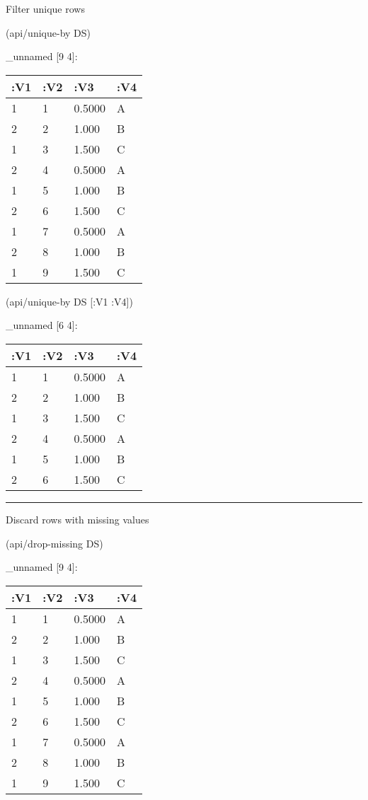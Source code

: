 \documentclass[]{article}
\newenvironment{Shaded}{\begin{snugshade}}{\end{snugshade}}
\newcommand{\AttributeTok}[1]{\textcolor[rgb]{0.77,0.63,0.00}{#1}}
\newcommand{\NormalTok}[1]{#1}
\begin{document}
Filter unique rows

\begin{Shaded}
\begin{Highlighting}[]
\NormalTok{(api/unique-by DS)}
\end{Highlighting}
\end{Shaded}

\_unnamed {[}9 4{]}:

\begin{longtable}[]{@{}llll@{}}
\toprule
:V1 & :V2 & :V3 & :V4\tabularnewline
\midrule
\endhead
1 & 1 & 0.5000 & A\tabularnewline
2 & 2 & 1.000 & B\tabularnewline
1 & 3 & 1.500 & C\tabularnewline
2 & 4 & 0.5000 & A\tabularnewline
1 & 5 & 1.000 & B\tabularnewline
2 & 6 & 1.500 & C\tabularnewline
1 & 7 & 0.5000 & A\tabularnewline
2 & 8 & 1.000 & B\tabularnewline
1 & 9 & 1.500 & C\tabularnewline
\bottomrule
\end{longtable}

\begin{Shaded}
\begin{Highlighting}[]
\NormalTok{(api/unique-by DS [}\AttributeTok{:V1} \AttributeTok{:V4}\NormalTok{])}
\end{Highlighting}
\end{Shaded}

\_unnamed {[}6 4{]}:

\begin{longtable}[]{@{}llll@{}}
\toprule
:V1 & :V2 & :V3 & :V4\tabularnewline
\midrule
\endhead
1 & 1 & 0.5000 & A\tabularnewline
2 & 2 & 1.000 & B\tabularnewline
1 & 3 & 1.500 & C\tabularnewline
2 & 4 & 0.5000 & A\tabularnewline
1 & 5 & 1.000 & B\tabularnewline
2 & 6 & 1.500 & C\tabularnewline
\bottomrule
\end{longtable}

\begin{center}\rule{0.5\linewidth}{0.5pt}\end{center}

Discard rows with missing values

\begin{Shaded}
\begin{Highlighting}[]
\NormalTok{(api/drop-missing DS)}
\end{Highlighting}
\end{Shaded}

\_unnamed {[}9 4{]}:

\begin{longtable}[]{@{}llll@{}}
\toprule
:V1 & :V2 & :V3 & :V4\tabularnewline
\midrule
\endhead
1 & 1 & 0.5000 & A\tabularnewline
2 & 2 & 1.000 & B\tabularnewline
1 & 3 & 1.500 & C\tabularnewline
2 & 4 & 0.5000 & A\tabularnewline
1 & 5 & 1.000 & B\tabularnewline
2 & 6 & 1.500 & C\tabularnewline
1 & 7 & 0.5000 & A\tabularnewline
2 & 8 & 1.000 & B\tabularnewline
1 & 9 & 1.500 & C\tabularnewline
\bottomrule
\end{longtable}
\end{document}
